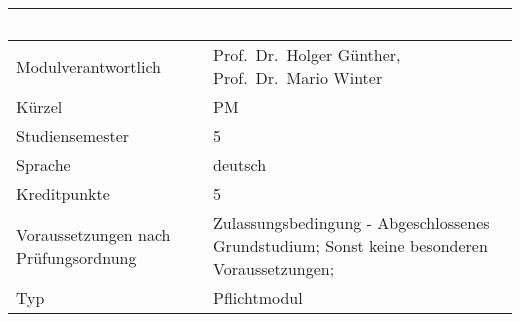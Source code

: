 \begin{longtable}[]{@{}ll@{}}
\toprule
\begin{minipage}[b]{0.12\columnwidth}\raggedright\strut
~\strut
\end{minipage} & \begin{minipage}[b]{0.12\columnwidth}\raggedright\strut
~\strut
\end{minipage}\tabularnewline
\midrule
\endhead
\begin{minipage}[t]{0.12\columnwidth}\raggedright\strut
Modulverantwortlich\strut
\end{minipage} & \begin{minipage}[t]{0.12\columnwidth}\raggedright\strut
Prof.~Dr.~Holger Günther, Prof.~Dr.~Mario Winter\strut
\end{minipage}\tabularnewline
\begin{minipage}[t]{0.12\columnwidth}\raggedright\strut
Kürzel\strut
\end{minipage} & \begin{minipage}[t]{0.12\columnwidth}\raggedright\strut
PM\strut
\end{minipage}\tabularnewline
\begin{minipage}[t]{0.12\columnwidth}\raggedright\strut
Studiensemester\strut
\end{minipage} & \begin{minipage}[t]{0.12\columnwidth}\raggedright\strut
5\strut
\end{minipage}\tabularnewline
\begin{minipage}[t]{0.12\columnwidth}\raggedright\strut
Sprache\strut
\end{minipage} & \begin{minipage}[t]{0.12\columnwidth}\raggedright\strut
deutsch\strut
\end{minipage}\tabularnewline
\begin{minipage}[t]{0.12\columnwidth}\raggedright\strut
Kreditpunkte\strut
\end{minipage} & \begin{minipage}[t]{0.12\columnwidth}\raggedright\strut
5\strut
\end{minipage}\tabularnewline
\begin{minipage}[t]{0.12\columnwidth}\raggedright\strut
Voraussetzungen nach Prüfungsordnung\strut
\end{minipage} & \begin{minipage}[t]{0.12\columnwidth}\raggedright\strut
Zulassungsbedingung - Abgeschlossenes Grundstudium; Sonst keine
besonderen Voraussetzungen;\strut
\end{minipage}\tabularnewline
\begin{minipage}[t]{0.12\columnwidth}\raggedright\strut
Typ\strut
\end{minipage} & \begin{minipage}[t]{0.12\columnwidth}\raggedright\strut
Pflichtmodul\strut
\end{minipage}\tabularnewline
\bottomrule
\end{longtable}

